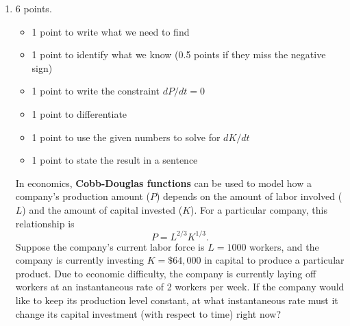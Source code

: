 \documentclass{article}
\begin{document}
\begin{enumerate}
\begin{enumerate}
  \end{enumerate}

\pspace{\newpage}



\item 

\begin{grading}
  6 points.   \begin{itemize}
        \item 1 point to write what we need to find
        \item 1 point to identify what we know (0.5 points if they miss the negative sign)
        \item 1 point to write the constraint $dP/dt = 0$
        \item 1 point to differentiate
        \item 1 point to use the given numbers to solve for $dK/dt$
        \item 1 point to state the result in a sentence
    \end{itemize}
\end{grading}

\begin{problem}
        In economics, \textbf{Cobb-Douglas functions} can be used to model how
        a company's production amount ($P$) depends on the amount of labor
        involved ($L$) and the amount of capital invested ($K$). For a
        particular company, this relationship is
        \[ P = L^{2/3} K^{1/3}.\] Suppose the company's current labor force is
        $L = 1000$ workers, and the company is currently investing $K =
        \$64,000$ in capital to produce a particular product.
        Due to economic difficulty, the company is currently laying off
        workers at an instantaneous rate of 2 workers per week. If the
        company would like to keep its production level constant, at what
        instantaneous rate must it change its capital investment (with
        respect to time) right now?
    \end{problem}
    \pspace{\vfill}


\end{enumerate}
\end{document}
